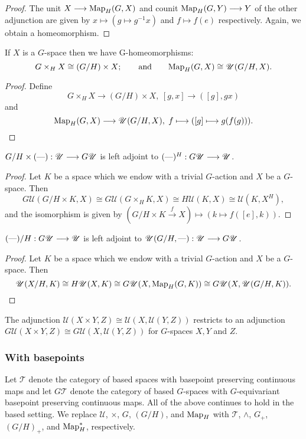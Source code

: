 \documentclass[11pt]{article}
\begin{document}
\begin{FirstWeek}
\begin{proof}
The unit $X\to\textup{Map}_H(G,X)$ and counit $\textup{Map}_H(G,Y)\to Y$ of the other adjunction are given by $x\mapsto (g\mapsto g^{-1}x)$ and $f\mapsto f(e)$ respectively. Again, we obtain a homeomorphism.
\end{proof}
\begin{thm*} If $X$ is a $G$-space then we have G-homeomorphisms:
\[G\times_H X\cong (G/H)\times X;\text{\qquad and\qquad}
\textup{Map}_H(G,X)\cong\mathscr{U}(G/H,X).\]
\end{thm*}
\begin{proof}
Define
\[G\times_H X\to (G/H)\times X,\hspace{3pt}[g,x]\to ([g],gx)\]
and
\[\textup{Map}_H(G,X)\to\mathscr{U}(G/H,X),\hspace{3pt}f\mapsto([g]\mapsto g(f(g))).\qedhere\]
\end{proof}
\begin{thm*} $G/H\times(\DASH):\mathscr{U}\to G\mathscr{U}$ is left adjoint to $(\DASH)^H:G\mathscr{U}\to\mathscr{U}$.
\end{thm*}
\begin{proof}
Let $K$ be a space which we endow with a trivial $G$-action and $X$ be a $G$-space. Then
\[G\mathscr{U}(G/H\times K, X)\cong G\mathscr{U}(G\times_H K,X)\cong
H\mathscr{U}(K,X)\cong\mathscr{U}(K,X^H),\]
and the isomorphism is given by $(G/H\times K\overset{f}{\to} X)\mapsto (k\mapsto f([e],k))$.
\end{proof}
\begin{thm*}
$(\DASH)/H:G\mathscr{U}\to\mathscr{U}$ is left adjoint to $\mathscr{U}(G/H,\DASH):\mathscr{U}\to G\mathscr{U}$.
\end{thm*}
\begin{proof}
Let $K$ be a space which we endow with a trivial $G$-action and $X$ be a $G$-space. Then
\[\mathscr{U}(X/H,K)\cong H\mathscr{U}(X,K)\cong G\mathscr{U}(X,\textup{Map}_H(G,K))\cong G\mathscr{U}(X,\mathscr{U}(G/H,K)).\qedhere\]
\end{proof}
\begin{thm*}
The adjunction $\mathscr{U}(X\times Y,Z)\cong\mathscr{U}(X,\mathscr{U}(Y,Z))$ restricts to an adjunction $G\mathscr{U}(X\times Y,Z)\cong G\mathscr{U}(X,\mathscr{U}(Y,Z))$ for $G$-spaces $X,Y$ and $Z$.
\end{thm*}
\subsubsection*{With basepoints}
Let $\mathscr{T}$ denote the category of based spaces with basepoint preserving continuous maps and let $G\mathscr{T}$ denote the category of based $G$-spaces with $G$-equivariant basepoint preserving continuous maps.
All of the above continues to hold in the based setting. We replace $\mathscr{U}$, $\times$, $G$, $(G/H)$, and $\textup{Map}_H$ with $\mathscr{T}$, $\wedge$, $G_+$, $(G/H)_+$, and $\textup{Map}^*_H$, respectively.


\end{FirstWeek}
\end{document}
